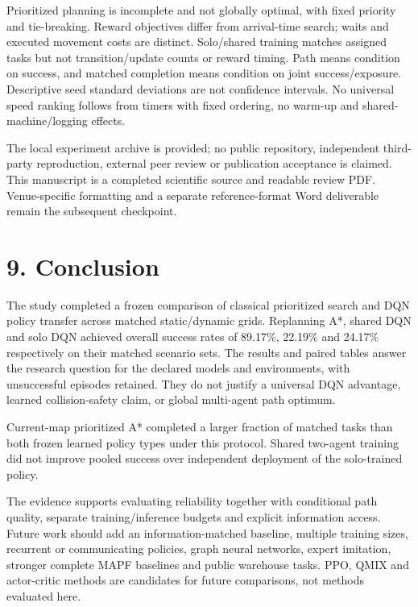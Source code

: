 \documentclass[10pt,a4paper]{article}
\begin{document}
Prioritized planning is incomplete and not globally optimal, with fixed priority and tie-breaking. Reward objectives differ from arrival-time search; waits and executed movement costs are distinct. Solo/shared training matches assigned tasks but not transition/update counts or reward timing. Path means condition on success, and matched completion means condition on joint success/exposure. Descriptive seed standard deviations are not confidence intervals. No universal speed ranking follows from timers with fixed ordering, no warm-up and shared-machine/logging effects.



The local experiment archive is provided; no public repository, independent third-party reproduction, external peer review or publication acceptance is claimed. This manuscript is a completed scientific source and readable review PDF. Venue-specific formatting and a separate reference-format Word deliverable remain the subsequent checkpoint.

\section*{9. Conclusion}



The study completed a frozen comparison of classical prioritized search and DQN policy transfer across matched static/dynamic grids. Replanning A*, shared DQN and solo DQN achieved overall success rates of 89.17\%, 22.19\% and 24.17\% respectively on their matched scenario sets. The results and paired tables answer the research question for the declared models and environments, with unsuccessful episodes retained. They do not justify a universal DQN advantage, learned collision-safety claim, or global multi-agent path optimum.



Current-map prioritized A* completed a larger fraction of matched tasks than both frozen learned policy types under this protocol. Shared two-agent training did not improve pooled success over independent deployment of the solo-trained policy.



The evidence supports evaluating reliability together with conditional path quality, separate training/inference budgets and explicit information access. Future work should add an information-matched baseline, multiple training sizes, recurrent or communicating policies, graph neural networks, expert imitation, stronger complete MAPF baselines and public warehouse tasks. PPO, QMIX and actor-critic methods are candidates for future comparisons, not methods evaluated here.
\end{document}
